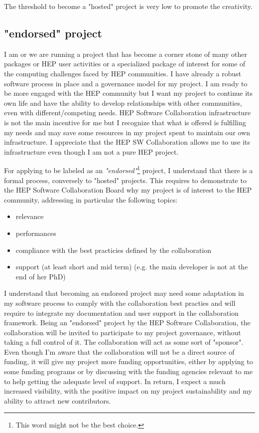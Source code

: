 \documentclass[11pt]{article} %
\begin{document}
The threshold to become a "hosted" project is very low to promote the creativity. 


\subsection{"endorsed" project }

I am or we are running a project that has become a corner stone of many other packages or HEP user activities or a specialized package of
interest for some of the computing challenges faced by HEP communities. I have already a robust software process in place and a governance model
for my project. I am ready to be more engaged with the HEP community but I want my project to continue its own life and have the ability to
develop relationships with other communities, even with different/competing needs. HEP Software Collaboration infrastructure is not the main incentive
for me but I recognize that what is offered is fulfilling my needs and may save some resources in my project spent to maintain our own infrastructure.
I appreciate that the HEP SW Collaboration allows me to use its infrastructure even though I am not a pure HEP project.

For applying to be labeled as an {\em "endorsed"}\footnote{This word might not be the best choice.} project, I understand that there is a formal
process, conversely to "hosted" projects. This requires to demonstrate to the HEP Software Collaboration Board why my project is of interest to the
HEP community, addressing in particular the following topics:
\begin{itemize}
\item relevance
\item performances 
\item compliance with the best practicies defined by the collaboration 
\item support (at least short and mid term) (e.g. the main developer is not at the end of her PhD) 
\end{itemize}

I understand that becoming an endorsed project may need some adaptation in my software process to comply with the collaboration best practies and will require
to integrate my documentation and user support in the collaboration framework. Being an "endorsed" project by the HEP Software Collaboration, the collaboration
will be invited to participate to my project governance, without taking a full control of it. The collaboration will act as some sort of "sponsor". Even though I'm aware
that the collaboration will not be a direct source of funding, it will give my project more funding opportunities, either by applying to some funding programs or 
by discussing with the funding
agencies relevant to me to help getting the adequate level of support. In return, I expect a much increased visibility, with the positive impact
on my project sustainability and my ability to attract new contributors.
\end{document}
